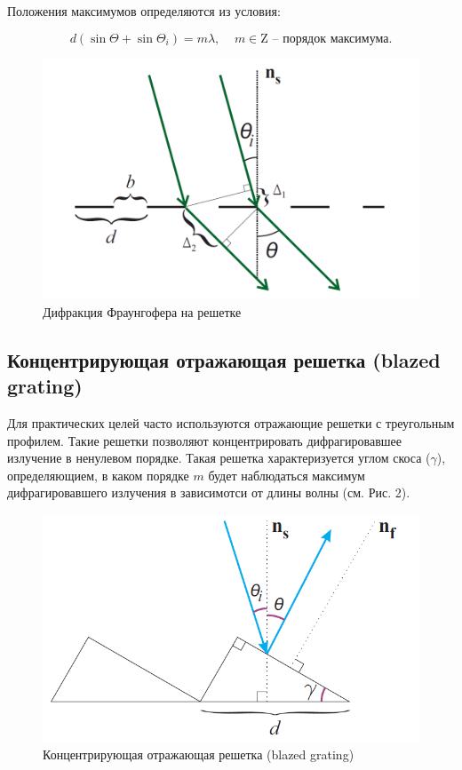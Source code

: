 \documentclass[a4paper, 12pt]{article}
\begin{document}
Положения максимумов определяются из условия:

\begin{equation}
d(\sin\Theta+\sin\Theta_i) = m\lambda, \;\;\;\; m\in\mathrm{Z} \text{ -- порядок максимума.}
\end{equation}


\begin{figure}[H]
	\centering
	\includegraphics[scale=0.6]{1}
	\caption{Дифракция Фраунгофера на решетке}
\end{figure}


\subsection{Концентрирующая отражающая решетка (blazed grating)}

Для практических целей часто используются отражающие решетки с треугольным профилем. Такие решетки позволяют концентрировать дифрагировавшее излучение в ненулевом порядке. Такая решетка характеризуется углом скоса ($\gamma$), определяющием, в каком порядке $m$ будет наблюдаться максимум дифрагировавшего излучения в зависимотси от длины волны (см. Рис. 2). 

\begin{figure}[H]
	\centering
	\includegraphics[scale=0.6]{2}
	\caption{Концентрирующая отражающая решетка (blazed grating)}
\end{figure}
\end{document}

